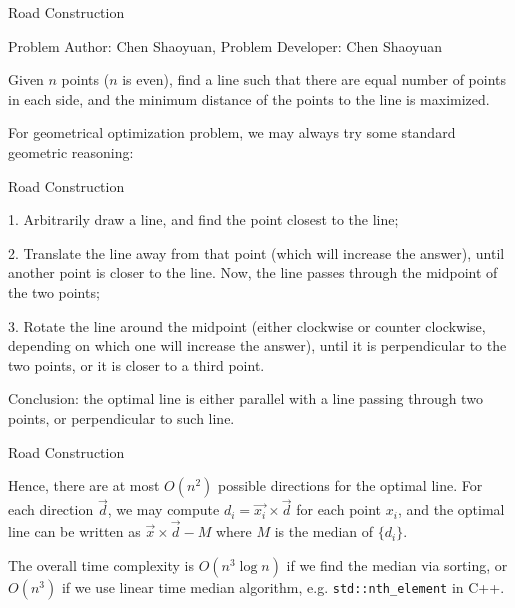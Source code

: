 \begin{Solution}{Road Construction}

\begin{frame}{\ProblemName}

\small Problem Author: Chen Shaoyuan, Problem Developer: Chen Shaoyuan \par \vspace{0.3cm}

Given $n$ points ($n$ is even), find a line such that there are equal number of points in each side, and the minimum distance of the points to the line is maximized.

\pause

For geometrical optimization problem, we may always try some standard geometric reasoning:

\end{frame}

\begin{frame}{Road Construction}

1. Arbitrarily draw a line, and find the point closest to the line;

\pause

2. Translate the line away from that point (which will increase the answer), until another point is closer to the line. Now, the line passes through the midpoint of the two points;

\pause

3. Rotate the line around the midpoint (either clockwise or counter clockwise, depending on which one will increase the answer), until it is perpendicular to the two points, or it is closer to a third point.

\pause 

Conclusion: the optimal line is either parallel with a line passing through two points, or perpendicular to such line.

\end{frame}

\begin{frame}{Road Construction}

Hence, there are at most $O(n^2)$ possible directions for the optimal line. For each direction $\vec{d}$, we may compute $d_i = \vec{x_i} \times \vec{d}$ for each point $x_i$, and the optimal line can be written as $\vec{x} \times \vec{d} - M$ where $M$ is the median of $\{d_i\}$.

The overall time complexity is $O(n^3 \log n)$ if we find the median via sorting, or $O(n^3)$ if we use linear time median algorithm, e.g. \texttt{std::nth\_element} in C++.

\end{frame}

\end{Solution}
